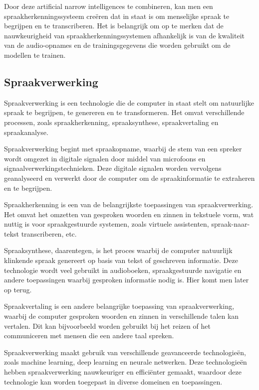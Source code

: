 Door deze artificial narrow intelligences te combineren, kan men een spraakherkenningssysteem creëren dat in staat is om menselijke spraak te begrijpen en te transcriberen. Het is belangrijk om op te merken dat de nauwkeurigheid van spraakherkenningssystemen afhankelijk is van de kwaliteit van de audio-opnames en de trainingsgegevens die worden gebruikt om de modellen te trainen.

\subsection{Spraakverwerking}

Spraakverwerking is een technologie die de computer in staat stelt om natuurlijke spraak te begrijpen, te genereren en te transformeren. Het omvat verschillende processen, zoals spraakherkenning, spraaksynthese, spraakvertaling en spraakanalyse.

Spraakverwerking begint met spraakopname, waarbij de stem van een spreker wordt omgezet in digitale signalen door middel van microfoons en signaalverwerkingstechnieken. Deze digitale signalen worden vervolgens geanalyseerd en verwerkt door de computer om de spraakinformatie te extraheren en te begrijpen.

Spraakherkenning is een van de belangrijkste toepassingen van spraakverwerking. Het omvat het omzetten van gesproken woorden en zinnen in tekstuele vorm, wat nuttig is voor spraakgestuurde systemen, zoals virtuele assistenten, spraak-naar-tekst transcriberen, etc.

Spraaksynthese, daarentegen, is het proces waarbij de computer natuurlijk klinkende spraak genereert op basis van tekst of geschreven informatie. Deze technologie wordt veel gebruikt in audioboeken, spraakgestuurde navigatie en andere toepassingen waarbij gesproken informatie nodig is. Hier komt men later op terug.

Spraakvertaling is een andere belangrijke toepassing van spraakverwerking, waarbij de computer gesproken woorden en zinnen in verschillende talen kan vertalen. Dit kan bijvoorbeeld worden gebruikt bij het reizen of het communiceren met mensen die een andere taal spreken.

Spraakverwerking maakt gebruik van verschillende geavanceerde technologieën, zoals machine learning, deep learning en neurale netwerken. Deze technologieën hebben spraakverwerking nauwkeuriger en efficiënter gemaakt, waardoor deze technologie kan worden toegepast in diverse domeinen en toepassingen.

